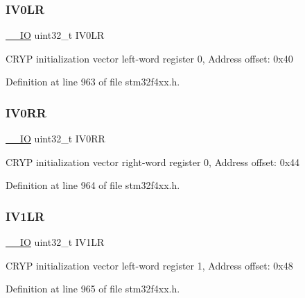 \subsubsection{\texorpdfstring{I\+V0\+LR}{IV0LR}}
{\footnotesize\ttfamily \hyperlink{group___c_m_s_i_s__core__definitions_gaec43007d9998a0a0e01faede4133d6be}{\+\_\+\+\_\+\+IO} uint32\+\_\+t I\+V0\+LR}

C\+R\+YP initialization vector left-\/word register 0, Address offset\+: 0x40 

Definition at line 963 of file stm32f4xx.\+h.

\mbox{\label{struct_c_r_y_p___type_def_aeb1990f7c28e815a4962db3a861937bb}} 
\subsubsection{\texorpdfstring{I\+V0\+RR}{IV0RR}}
{\footnotesize\ttfamily \hyperlink{group___c_m_s_i_s__core__definitions_gaec43007d9998a0a0e01faede4133d6be}{\+\_\+\+\_\+\+IO} uint32\+\_\+t I\+V0\+RR}

C\+R\+YP initialization vector right-\/word register 0, Address offset\+: 0x44 

Definition at line 964 of file stm32f4xx.\+h.

\mbox{\label{struct_c_r_y_p___type_def_aad2f43335b25a0065f3d327364610cbd}} 
\subsubsection{\texorpdfstring{I\+V1\+LR}{IV1LR}}
{\footnotesize\ttfamily \hyperlink{group___c_m_s_i_s__core__definitions_gaec43007d9998a0a0e01faede4133d6be}{\+\_\+\+\_\+\+IO} uint32\+\_\+t I\+V1\+LR}

C\+R\+YP initialization vector left-\/word register 1, Address offset\+: 0x48 

Definition at line 965 of file stm32f4xx.\+h.

\mbox{\label{struct_c_r_y_p___type_def_a38a9f05c03174023fc6ac951c04eaeff}} 
